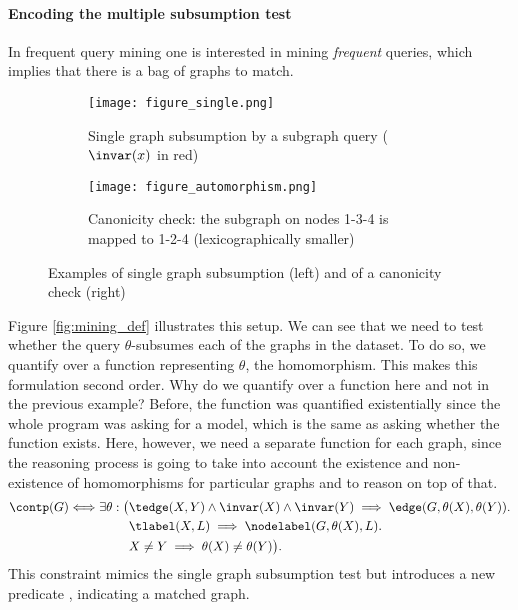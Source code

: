 \paragraph{Encoding the multiple subsumption test}
In frequent query mining one is interested in mining \textit{frequent} queries, which implies that there is a bag of graphs to match. 

\begin{figure}[t]
  \begin{center}
    
  \begin{subfigure}{.48\textwidth}
    \captionsetup{
    }
    \begin{center}
      \texttt{[image: figure\_single.png]}
      \caption{Single graph subsumption by a subgraph query ($\invar(x)$ in red)}
      \label{fig:single}
    \end{center}
    \hfill 
  \end{subfigure}
    \begin{subfigure}{.48\textwidth}
    \captionsetup{
    }
    \begin{center}

      \texttt{[image: figure\_automorphism.png]}
      \caption{Canonicity check: the subgraph on nodes 1-3-4 is mapped to 1-2-4 (lexicographically smaller)}
      \label{fig:automorphism}
    \end{center}
  \end{subfigure}
 
    \captionsetup{
    }
  \caption{Examples of single graph subsumption (left) and of a canonicity check (right)}
  \end{center}
\end{figure}

Figure \ref{fig:mining_def} illustrates this setup. We can see that we need to test whether the query $\theta$-subsumes each of the graphs in the dataset. To do so, we quantify over a function representing $\theta$, the homomorphism. This makes this formulation second order. Why do we quantify over a function here and not in the previous example? Before, the function was quantified existentially since the whole program was asking for a model, which is the same as asking whether the function exists. Here, however, we need a separate function for each graph, since the reasoning process is going to take into account the existence and non-existence of homomorphisms for particular graphs and to reason on top of that.
\begin{equation}
  \begin{aligned}
    \contp(G) \Longleftrightarrow \exists \theta: \big ( & \tedge(X,Y) \wedge \invar(X) \wedge \invar(Y) \implies \edge(G,\theta(X),\theta(Y)).\\
    & \tlabel(X,L) \implies \nodelabel(G,\theta(X),L). \\
    & X \neq Y \implies \theta(X) \neq \theta(Y) \big ).          
  \end{aligned}
  \label{eq:ho-matching}
\end{equation}
This constraint mimics the single graph subsumption test but introduces a new predicate \contp, indicating a matched graph. 

